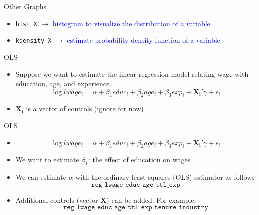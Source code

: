 \documentclass[11pt,notes=hide,aspectratio=169,mathserif]{beamer}
\begin{document}
\begin{frame}{Other Graphs}
    \begin{itemize}
    \item \texttt{hist X}   $\rightarrow$ \textcolor{blue}{histogram to visualize the distribution of a variable}
    \item \texttt{kdensity X}   $\rightarrow$ \textcolor{blue}{estimate probability density function of a variable}
    \end{itemize}
\end{frame}

\begin{frame}{OLS}
    \begin{itemize}
        \item Suppose we want to estimate the linear regression model relating wage with education, age, and experience.
        $$\log lwage_i = \alpha + \beta_1 educ_i + \beta_2 age_i + \beta_3 exp_i + \mathbf{X_i}'\gamma + \epsilon_i $$ 
        \item $\mathbf{X_i}$ is a vector of controls (ignore for now)
    \end{itemize}
\end{frame}

\begin{frame}{OLS}
    \begin{itemize}
        \item 
        $$\log lwage_i = \alpha + \beta_1 educ_i + \beta_2 age_i + \beta_3 exp_i + \mathbf{X_i}'\gamma + \epsilon_i $$ 
        \item We want to estimate $\beta_1$: the effect of education on wages
        \item We can estimate $\alpha$ with the ordinary least squares (OLS) estimator as follows
            $$\texttt{reg lwage educ age ttl\_exp}$$ 
        \item Additional controls (vector $\mathbf{X}$) can be added. For example,
            $$\texttt{reg lwage educ age ttl\_exp tenure industry}$$ 
    \end{itemize}
\end{frame}
\end{document}
